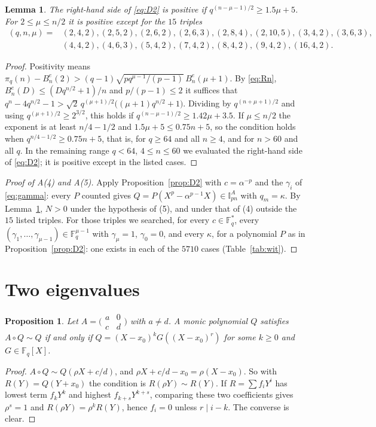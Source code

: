 \documentclass[11pt,a4paper]{amsart}
\newtheorem{lemma}[theorem]{Lemma}
\newtheorem{proposition}[theorem]{Proposition}
\theoremstyle{remark}
\newcommand{\Fq}{\mathbb{F}_q}
\newcommand{\I}{\mathbb{I}}
\newcommand{\mat}[4]{\bigl(\begin{smallmatrix}#1&#2\\#3&#4\end{smallmatrix}\bigr)}
\begin{document}
\begin{lemma}\label{lem:D2pos}
The right-hand side of \eqref{eq:D2} is positive if $q^{(n-\mu-1)/2}\ge1.5\mu+5$. For $2\le\mu\le n/2$ it is
positive except for the $15$ triples
\[
\begin{aligned}
(q,n,\mu)={}&(2,4,2),(2,5,2),(2,6,2),(2,6,3),(2,8,4),(2,10,5),(3,4,2),(3,6,3),\\
&(4,4,2),(4,6,3),(5,4,2),(7,4,2),(8,4,2),(9,4,2),(16,4,2).
\end{aligned}
\]
\end{lemma}
\begin{proof}
Positivity means $\pi_q(n)-B^e_n(2)>(q-1)\sqrt{pq^{\mu-1}/(p-1)}\,B^e_n(\mu+1)$. By \eqref{eq:Rn},
$B^e_n(D)\le(Dq^{n/2}+1)/n$ and $p/(p-1)\le2$ it suffices that
$q^n-4q^{n/2}-1>\sqrt2\,q^{(\mu+1)/2}\bigl((\mu+1)q^{n/2}+1\bigr)$. Dividing by $q^{(n+\mu+1)/2}$ and using
$q^{(\mu+1)/2}\ge2^{3/2}$, this holds if $q^{(n-\mu-1)/2}\ge1.42\mu+3.5$. If $\mu\le n/2$ the exponent is at
least $n/4-1/2$ and $1.5\mu+5\le0.75n+5$, so the condition holds when $q^{n/4-1/2}\ge0.75n+5$, that is, for
$q\ge64$ and all $n\ge4$, and for $n>60$ and all $q$. In the remaining range $q<64$, $4\le n\le60$ we evaluated
the right-hand side of \eqref{eq:D2}; it is positive except in the listed cases.
\end{proof}

\begin{proof}[Proof of A(4) and A(5)]
Apply Proposition~\ref{prop:D2} with $c=\alpha^{-p}$ and the $\gamma_i$ of \eqref{eq:gamma}: every $P$ counted
gives $Q=P(X^p-\alpha^{p-1}X)\in\I^A_{pn}$ with $q_m=\kappa$. By Lemma~\ref{lem:D2pos}, $N>0$ under the
hypothesis of (5), and under that of (4) outside the $15$ listed triples. For those triples we searched, for
every $c\in\Fq^*$, every $(\gamma_1,\dots,\gamma_{\mu-1})\in\Fq^{\mu-1}$ with $\gamma_\mu=1$, $\gamma_0=0$, and every
$\kappa$, for a polynomial $P$ as in Proposition~\ref{prop:D2}: one exists in each of the $5710$ cases
(Table~\ref{tab:wit}).
\end{proof}

\section{Two eigenvalues}\label{sec:two}

\begin{proposition}\label{prop:struct}
Let $A=\mat a0cd$ with $a\ne d$. A monic polynomial $Q$ satisfies $A\circ Q\sim Q$ if and only if
$Q=(X-x_0)^kG((X-x_0)^r)$ for some $k\ge0$ and $G\in\Fq[X]$.
\end{proposition}
\begin{proof}
$A\circ Q\sim Q(\rho X+c/d)$, and $\rho X+c/d-x_0=\rho(X-x_0)$. So with $R(Y)=Q(Y+x_0)$ the condition is
$R(\rho Y)\sim R(Y)$. If $R=\sum f_iY^i$ has lowest term $f_kY^k$ and highest $f_{k+s}Y^{k+s}$, comparing these
two coefficients gives $\rho^s=1$ and $R(\rho Y)=\rho^kR(Y)$, hence $f_i=0$ unless $r\mid i-k$. The converse is
clear.
\end{proof}
\end{document}
